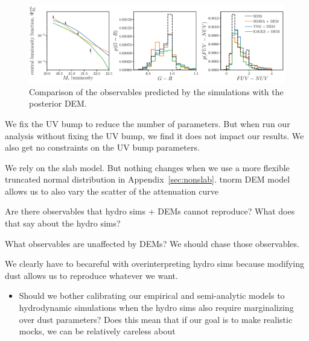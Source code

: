 \begin{figure}
\begin{center}
    \includegraphics[width=\textwidth]{figs/abc_observables_1d.pdf}
    \caption{Comparison of the observables predicted by the simulations with
    the posterior DEM.}
\label{fig:dem1d}
\end{center}
\end{figure}

We fix the UV bump to reduce the number of parameters. But when run our
analysis without fixing the UV bump, we find it does not impact our results.
We also get no constraints on the UV bump parameters. 

We rely on the slab model. But nothing changes when we use a more flexible
truncated normal distribution in Appendix~\ref{sec:nonslab}. tnorm DEM model allows us to also vary the
scatter of the attenuation curve 



Are there observables that hydro sims + DEMs cannot reproduce? What does that say about the hydro sims?

What observables are unaffected by DEMs? We should chase those observables. 

We clearly have to becareful with overinterpreting hydro sims because modifying
dust allows us to reproduce whatever we want. 
\begin{itemize}
    \item Should we bother calibrating our empirical and semi-analytic models
        to hydrodynamic simulations when the hydro sims also require
        marginalizing over dust parameters? Does this mean that if our goal is
        to make realistic mocks, we can be relatively careless about 
\end{itemize}



